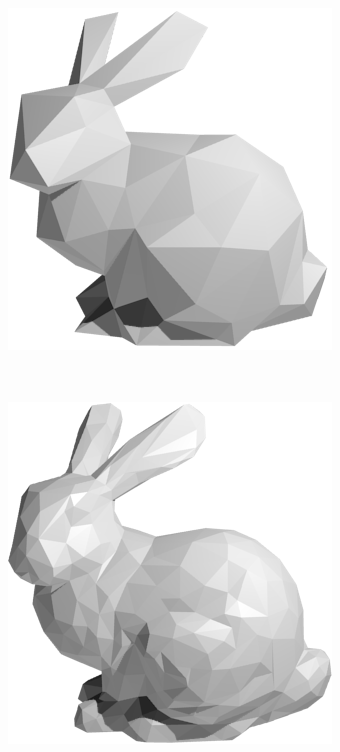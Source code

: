 \begin{figure}
    \centering
    \begin{subfigure}[b]{0.2\textwidth}
        \includegraphics[width=\textwidth]{figures/lod/decimation3.png}
    \end{subfigure}
    ~ %
    \begin{subfigure}[b]{0.2\textwidth}
        \includegraphics[width=\textwidth]{figures/lod/decimation2.png}

\end{subfigure}
\end{figure}
